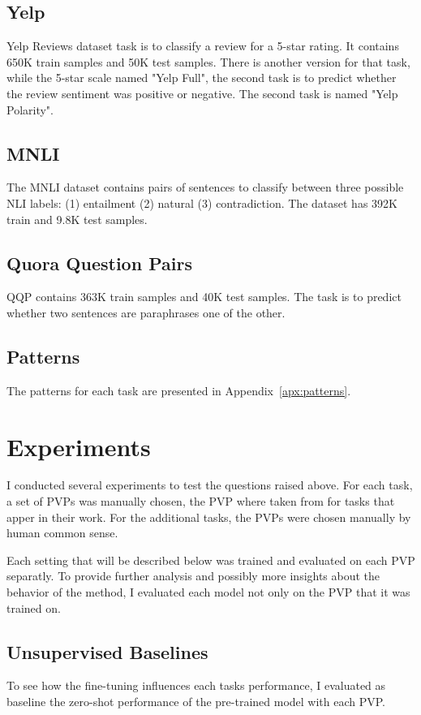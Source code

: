 \documentclass[11pt,a4paper]{article}
\begin{document}
\subsection{Yelp}
Yelp Reviews dataset task is to classify a review for a 5-star rating.
It contains 650K train samples and 50K test samples.
There is another version for that task, while the 5-star scale named "Yelp Full", the second task is to predict whether the review sentiment was positive or negative.
The second task is named "Yelp Polarity".

\subsection{MNLI}
The MNLI dataset contains pairs of sentences to classify between three possible NLI labels: (1) entailment (2) natural (3) contradiction. 
The dataset has 392K train and 9.8K test samples. 

\subsection{Quora Question Pairs}
QQP contains 363K train samples and 40K test samples.
The task is to predict whether two sentences are paraphrases one of the other.

\subsection{Patterns}
The patterns for each task are presented in Appendix~\ref{apx:patterns}.


\section{Experiments}

I conducted several experiments to test the questions raised above.
For each task, a set of PVPs was manually chosen, the PVP where taken from \citet{schick2020exploiting} for tasks that apper in their work.
For the additional tasks, the PVPs were chosen manually by human common sense. 

Each setting that will be described below was trained and evaluated on each PVP separatly.
To provide further analysis and possibly more insights about the behavior of the method, I evaluated each model not only on the PVP that it was trained on.

\subsection{Unsupervised Baselines}
To see how the fine-tuning influences each tasks performance, I evaluated as baseline the zero-shot performance of the pre-trained model with each PVP.
\end{document}
